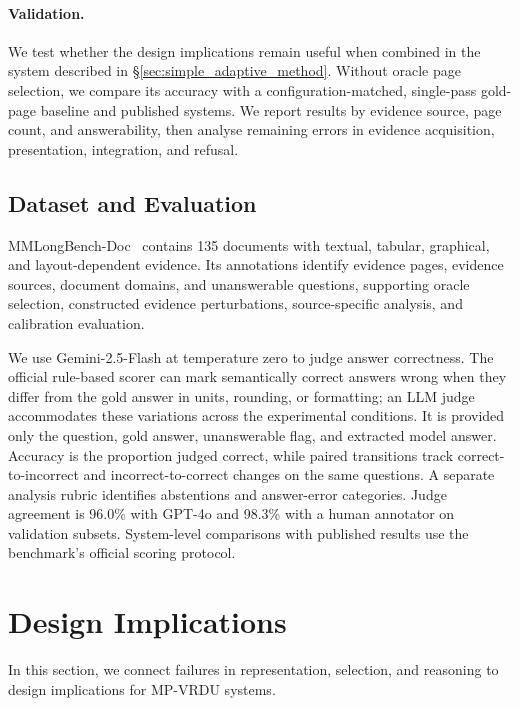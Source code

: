 \documentclass[11pt]{article}
\begin{document}
\paragraph{Validation.}
We test whether the design implications remain useful when combined in the system described in \S\ref{sec:simple_adaptive_method}. Without oracle page selection, we compare its accuracy with a configuration-matched, single-pass gold-page baseline and published systems. We report results by evidence source, page count, and answerability, then analyse remaining errors in evidence acquisition, presentation, integration, and refusal.

% 

\subsection{Dataset and Evaluation}
\label{sec:dataset_evaluation}

MMLongBench-Doc~\citep{ma2024mmlongbench} contains 135 documents with textual, tabular, graphical, and layout-dependent evidence. Its annotations identify evidence pages, evidence sources, document domains, and unanswerable questions, supporting oracle selection, constructed evidence perturbations, source-specific analysis, and calibration evaluation.

We use Gemini-2.5-Flash at temperature zero to judge answer correctness. The official rule-based scorer can mark semantically correct answers wrong when they differ from the gold answer in units, rounding, or formatting; an LLM judge accommodates these variations across the experimental conditions. It is provided only the question, gold answer, unanswerable flag, and extracted model answer. Accuracy is the proportion judged correct, while paired transitions track correct-to-incorrect and incorrect-to-correct changes on the same questions. A separate analysis rubric identifies abstentions and answer-error categories. Judge agreement is 96.0\% with GPT-4o and 98.3\% with a human annotator on validation subsets. System-level comparisons with published results use the benchmark's official scoring protocol.

\section{Design Implications}
\label{sec:findings}

In this section, we connect failures in representation, selection, and reasoning to design implications for MP-VRDU systems.
\end{document}
